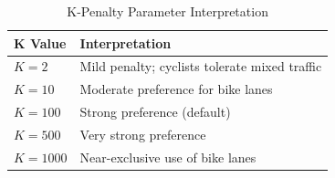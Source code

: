 \begin{table}[H]
\centering
\caption{K-Penalty Parameter Interpretation}
\label{tab:k_values}
\begin{tabular}{@{}ll@{}}
\toprule
\textbf{K Value} & \textbf{Interpretation} \\
\midrule
$K = 2$ & Mild penalty; cyclists tolerate mixed traffic \\
$K = 10$ & Moderate preference for bike lanes \\
$K = 100$ & Strong preference (default) \\
$K = 500$ & Very strong preference \\
$K = 1000$ & Near-exclusive use of bike lanes \\
\bottomrule
\end{tabular}
\end{table}
